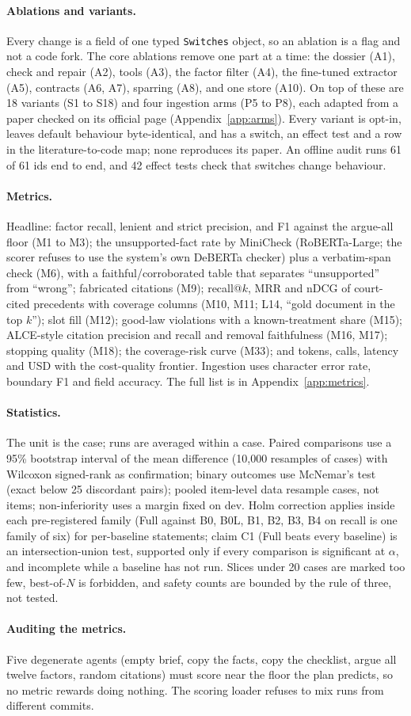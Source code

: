 \paragraph{Ablations and variants.} Every change is a field of one typed \texttt{Switches} object, so an ablation is a flag and not a code fork. The core ablations remove one part at a time: the dossier (A1), check and repair (A2), tools (A3), the factor filter (A4), the fine-tuned extractor (A5), contracts (A6, A7), sparring (A8), and one store (A10). On top of these are 18 variants (S1 to S18) and four ingestion arms (P5 to P8), each adapted from a paper checked on its official page (Appendix~\ref{app:arms}). Every variant is opt-in, leaves default behaviour byte-identical, and has a switch, an effect test and a row in the literature-to-code map; none reproduces its paper. An offline audit runs 61 of 61 ids end to end, and 42 effect tests check that switches change behaviour.

\paragraph{Metrics.} Headline: factor recall, lenient and strict precision, and F1 against the argue-all floor (M1 to M3); the unsupported-fact rate by MiniCheck (RoBERTa-Large; the scorer refuses to use the system's own DeBERTa checker) plus a verbatim-span check (M6), with a faithful/corroborated table that separates ``unsupported'' from ``wrong''; fabricated citations (M9); recall@$k$, MRR and nDCG of court-cited precedents with coverage columns (M10, M11; L14, ``gold document in the top $k$''); slot fill (M12); good-law violations with a known-treatment share (M15); ALCE-style citation precision and recall and removal faithfulness (M16, M17); stopping quality (M18); the coverage-risk curve (M33); and tokens, calls, latency and USD with the cost-quality frontier. Ingestion uses character error rate, boundary F1 and field accuracy. The full list is in Appendix~\ref{app:metrics}.

\paragraph{Statistics.} The unit is the case; runs are averaged within a case. Paired comparisons use a 95\% bootstrap interval of the mean difference (10,000 resamples of cases) with Wilcoxon signed-rank as confirmation; binary outcomes use McNemar's test (exact below 25 discordant pairs); pooled item-level data resample cases, not items; non-inferiority uses a margin fixed on dev. Holm correction applies inside each pre-registered family (Full against B0, B0L, B1, B2, B3, B4 on recall is one family of six) for per-baseline statements; claim C1 (Full beats every baseline) is an intersection-union test, supported only if every comparison is significant at $\alpha$, and incomplete while a baseline has not run. Slices under 20 cases are marked too few, best-of-$N$ is forbidden, and safety counts are bounded by the rule of three, not tested.

\paragraph{Auditing the metrics.} Five degenerate agents (empty brief, copy the facts, copy the checklist, argue all twelve factors, random citations) must score near the floor the plan predicts, so no metric rewards doing nothing. The scoring loader refuses to mix runs from different commits.

